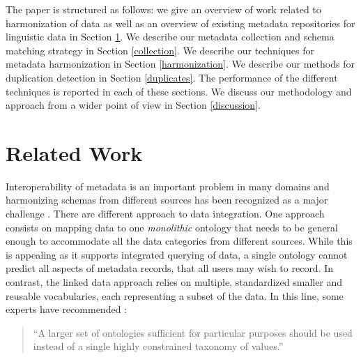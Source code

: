 \documentclass[11pt]{article}
\begin{document}
The paper is structured as follows: we give an overview of work related to
harmonization of data as well as an overview of existing metadata repositories
for linguistic data in Section \ref{rel_work}. We describe our metadata
collection and schema matching strategy in Section \ref{collection}. We describe
our techniques for metadata harmonization in Section \ref{harmonization}. We
describe our methods for duplication detection in Section \ref{duplicates}. The
performance of the different techniques is reported in each of these sections.
We discuss our methodology and approach from a wider point of view in Section
\ref{discussion}. 


\section{Related Work}

\label{rel_work}

Interoperability of metadata is an important problem in many domains and
harmonizing schemas from different sources has been recognized as a major
challenge 
\cite{nilsson2010interoperability,khoo2010merging,nogueras2004metadata}. 
There are different approach to data integration. One approach consists on
mapping data to one \emph{monolithic} ontology that needs to be general enough
to accommodate all the data categories from different sources. While this is 
appealing as it supports integrated querying of data, a
single ontology cannot predict all aspects of metadata
records, that all users may wish to record. In contrast, the linked data approach relies on
multiple, standardized smaller and reusable vocabularies, each representing a 
subset of the data.  In this line, some experts have recommended \cite{brooks2006towards}:

\begin{quote}
``A larger set of ontologies sufficient for particular purposes should
be used instead of a single highly constrained taxonomy of values.''
\end{quote}

\end{document}
